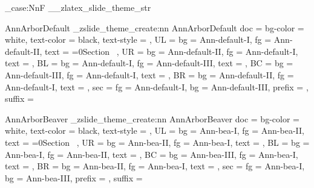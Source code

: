 \str_case:NnF \g__zlatex_slide_theme_str {
  {AnnArborDefault}{
    \_zslide_theme_create:nn {AnnArborDefault}{
      doc = {
        bg-color = white,
        text-color = black,
        text-style = \sfdefault
      },
      UL = {
        bg   = Ann-default-I,
        fg   = Ann-default-II,
        text = {\ifnum{}=0\else Section\ \thesection\fi}
      },
      UR = {
        bg   = Ann-default-II,
        fg   = Ann-default-I,
        text = {\zslideDefaultUR}
      },
      BL = {
        bg   = Ann-default-I,
        fg   = Ann-default-III,
        text = \zslideAuthor
      },
      BC = {
        bg   = Ann-default-III,
        fg   = Ann-default-I,
        text = \zslideTitle
      },
      BR = {
        bg   = Ann-default-II,
        fg   = Ann-default-I,
        text = \zslideDefaultBR
      },
      sec = {
        fg   = Ann-default-I,
        bg   = Ann-default-III,
        prefix = {},
        suffix = {}
      }
    }
  }

  {AnnArborBeaver}{
    \_zslide_theme_create:nn {AnnArborBeaver}{ 
      doc = {
        bg-color = white,
        text-color = black,
        text-style = \sfdefault
      },
      UL = {
        bg   = Ann-bea-I,
        fg   = Ann-bea-II, 
        text = {\ifnum{}=0\else Section\ \thesection\fi} 
      },
      UR = {
        bg   = Ann-bea-II,
        fg   = Ann-bea-I,
        text = {\zslideDefaultUR}
      },
      BL = {
        bg   = Ann-bea-I,
        fg   = Ann-bea-II,
        text = \zslideAuthor
      },
      BC = {
        bg   = Ann-bea-III,
        fg   = Ann-bea-I,
        text = \zslideTitle
      },
      BR = {
        bg   = Ann-bea-II,
        fg   = Ann-bea-I,
        text = \zslideDefaultBR 
      },
      sec = {
        fg   = Ann-bea-I,
        bg   = Ann-bea-III,
        prefix = {},
        suffix = {}
      }
    }
  }

}
